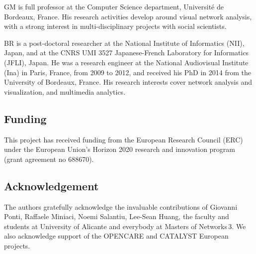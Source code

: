 \documentclass{bmcart}
\begin{document}
\begin{backmatter}
GM is full professor at the Computer Science department, Universit\'e de Bordeaux, France. His research activities develop around visual network analysis, with a strong interest in multi-disciplinary projects with social scientists.

BR is a post-doctoral researcher at the National Institute of Informatics (NII), Japan, and at the CNRS UMI 3527 Japanese-French Laboratory for Informatics (JFLI), Japan. He was a research engineer at the National Audiovisual Institute (Ina) in Paris, France, from 2009 to 2012, and received his PhD in 2014 from the University of Bordeaux, France. His research interests cover network analysis and visualization, and multimedia analytics.

\subsection*{Funding}
This project has received funding from the European Research Council (ERC) under the European Union's Horizon 2020 research and innovation program (grant agreement no 688670).

\subsection*{Acknowledgement}
The authors gratefully acknowledge the invaluable contributions of Giovanni Ponti, Raffaele Miniaci, Noemi Salantiu, Lee-Sean Huang, the faculty and students at University of Alicante and everybody at Masters of Networks\,3. We also acknowledge support of the OPENCARE and CATALYST European projects.




\end{backmatter}
\end{document}
